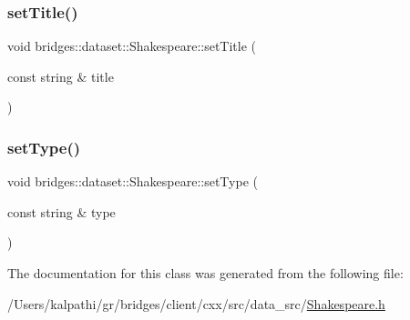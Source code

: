 \subsubsection{\texorpdfstring{set\+Title()}{setTitle()}}
{\footnotesize\ttfamily void bridges\+::dataset\+::\+Shakespeare\+::set\+Title (\begin{DoxyParamCaption}\item[{const string \&}]{title }\end{DoxyParamCaption})\hspace{0.3cm}{\ttfamily [inline]}}

\mbox{\label{classbridges_1_1dataset_1_1_shakespeare_a4e9d1126524d2b10f5fe36ffd4588f15}} 
\subsubsection{\texorpdfstring{set\+Type()}{setType()}}
{\footnotesize\ttfamily void bridges\+::dataset\+::\+Shakespeare\+::set\+Type (\begin{DoxyParamCaption}\item[{const string \&}]{type }\end{DoxyParamCaption})\hspace{0.3cm}{\ttfamily [inline]}}



The documentation for this class was generated from the following file\+:\begin{DoxyCompactItemize}
\item 
/\+Users/kalpathi/gr/bridges/client/cxx/src/data\+\_\+src/\mbox{\hyperlink{_shakespeare_8h}{Shakespeare.\+h}}\end{DoxyCompactItemize}

